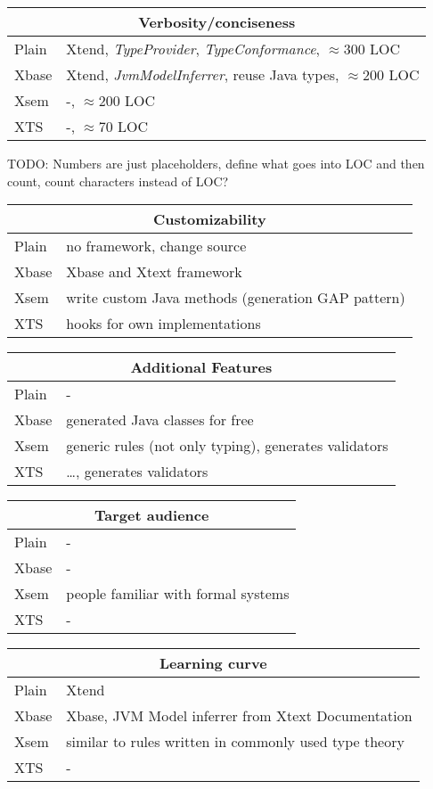 \begin{frame}
\framebreak
\begin{tabularx}{\linewidth}{ l   X }
\multicolumn{2}{c}{Verbosity/conciseness} \\ \hline
Plain & Xtend, \emph{TypeProvider}, \emph{TypeConformance}, $\approx$300 LOC\\
Xbase & Xtend, \emph{JvmModelInferrer}, reuse Java types, $\approx$200 LOC  \\
Xsem &  -, $\approx$200 LOC \\
XTS & -, $\approx$70 LOC\\
\end{tabularx}

TODO: Numbers are just placeholders, define what goes into LOC and then count,
count characters instead of LOC?

\framebreak
\begin{tabularx}{\linewidth}{ l   X }
\multicolumn{2}{c}{Customizability} \\ \hline
Plain & no framework, change source \\
Xbase & Xbase and Xtext framework \\
Xsem & write custom Java methods (generation GAP
pattern)
\\
XTS & hooks for own implementations \\
\end{tabularx}

\framebreak
\begin{tabularx}{\linewidth}{ l   X }
\multicolumn{2}{c}{Additional Features} \\ \hline
Plain & - \\
Xbase & generated Java classes for free \\
Xsem & generic rules (not only typing), generates validators \\
XTS & \ldots, generates validators \\
\end{tabularx}

\framebreak
\begin{tabularx}{\linewidth}{ l   X }
\multicolumn{2}{c}{Target audience} \\ \hline
Plain & - \\
Xbase & - \\
Xsem & people familiar with formal systems \\
XTS & - \\
\end{tabularx}

\framebreak
\begin{tabularx}{\linewidth}{ l   X }
\multicolumn{2}{c}{Learning curve} \\ \hline
Plain & Xtend \\
Xbase & Xbase, JVM Model inferrer from Xtext Documentation \\
Xsem & similar to rules written in commonly used type theory \\
XTS & - \\
\end{tabularx}


\end{frame}
